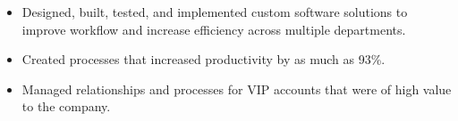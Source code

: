\documentclass[12pt,letter]{altacv}
\begin{document}
  \divider

  \begin{itemize}
  \item Designed, built, tested, and implemented custom software solutions to improve workflow and increase efficiency across multiple departments.
  \item Created processes that increased productivity by as much as 93\%.
  \item Managed relationships and processes for VIP accounts that were of high value to the company.
  \end{itemize}

\medskip
\end{document}

